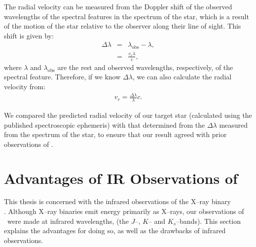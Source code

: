 \vspace{\myparskip}

The radial velocity can be measured from the
Doppler shift of the observed wavelengths of the spectral features
in the spectrum of the star, which is a result of the motion of the star relative to the observer along their line of sight. This shift is given by:%
\begin{eqnarray}
\label{cha:InfraredDataReductionTechniques:sec:Spectroscopy:subsec:RadialVelocity:eqn:shift}
\Delta\lambda 	& = & \lambda_{\mathrm{obs}} - \lambda,\\
       		& = & \frac{v_r \lambda}{c},
\end{eqnarray}
where $\lambda$ and $\lambda_{\mathrm{obs}}$ are the rest and
observed wavelengths, respectively, of the spectral
feature. Therefore, if we know $\Delta\lambda$, we can also calculate the
radial velocity from:%
\begin{eqnarray}
\label{cha:InfraredDataReductionTechniques:sec:Spectroscopy:subsec:RadialVelocity:eqn:vr2}
v_r = \frac{\Delta\lambda}{\lambda} c.
\end{eqnarray}

\vspace{\myparskip}

We compared the predicted radial velocity of our target star
(calculated using the published spectroscopic ephemeris) with that
determined from the $\Delta\lambda$ measured from the spectrum of the star, to ensure that our result agreed with prior observations of \groj. %


\section{Advantages of IR Observations of \groj}
\label{cha:InfraredDataReductionTechniques:sec:InfraredAstronomy}

This thesis is concerned with the infrared observations of the X--ray binary\\%
\groj. Although X--ray binaries emit energy primarily as X--rays, our
observations of \groj\ were made at infrared wavelengths,
(the $J$--, $K$-- and $K_{s}$--bands). This section explains the
advantages for doing so, as well as the drawbacks of infrared
observations. %


